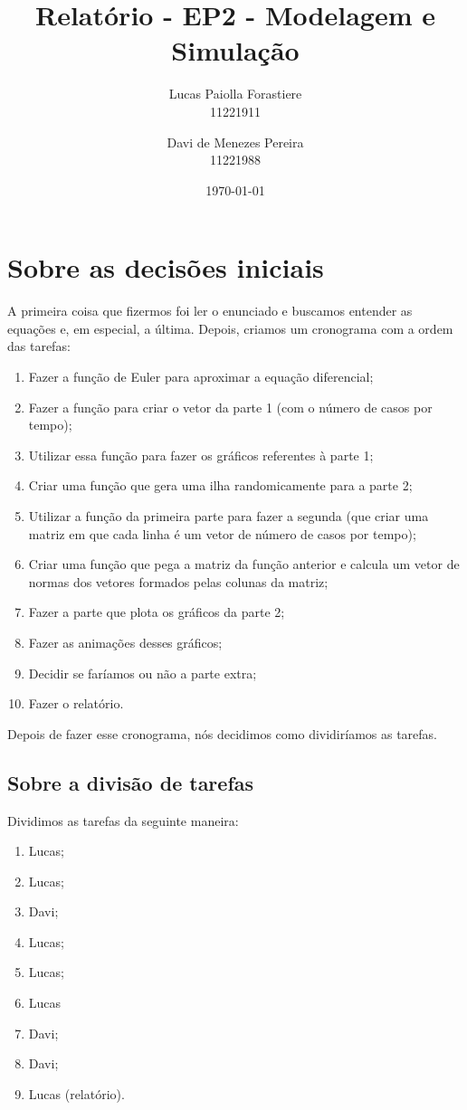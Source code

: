 \documentclass[12pt, a4paper, oneside]{article}
\title{Relatório - EP2 - Modelagem e Simulação}
\date{\today}
\author{
Lucas Paiolla Forastiere \\ 11221911 
\and
Davi de Menezes Pereira \\ 11221988
}
\begin{document}
\maketitle
\newpage

\section{Sobre as decisões iniciais}

A primeira coisa que fizermos foi ler o enunciado e buscamos entender as equações
e, em especial, a última. Depois, criamos um cronograma com a ordem das tarefas:

\begin{enumerate}
\item Fazer a função de Euler para aproximar a equação diferencial;
\item Fazer a função para criar o vetor da parte 1 (com o número de casos por
tempo);
\item Utilizar essa função para fazer os gráficos referentes à parte 1;
\item Criar uma função que gera uma ilha randomicamente para a parte 2;
\item Utilizar a função da primeira parte para fazer a segunda (que criar uma matriz
em que cada linha é um vetor de número de casos por tempo);
\item Criar uma função que pega a matriz da função anterior e calcula um vetor 
de normas dos vetores formados pelas colunas da matriz;
\item Fazer a parte que plota os gráficos da parte 2;
\item Fazer as animações desses gráficos;
\item Decidir se faríamos ou não a parte extra;
\item Fazer o relatório.
\end{enumerate}

Depois de fazer esse cronograma, nós decidimos como dividiríamos as tarefas.

\subsection{Sobre a divisão de tarefas}

Dividimos as tarefas da seguinte maneira:

\begin{enumerate}
\item Lucas;
\item Lucas;
\item Davi;
\item Lucas;
\item Lucas;
\item Lucas
\item Davi;
\item Davi;
\item Lucas (relatório).
\end{enumerate}
\end{document}
